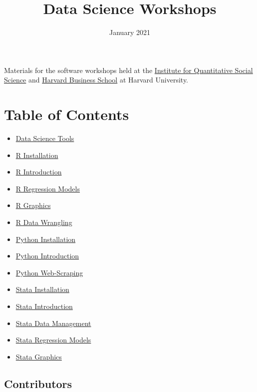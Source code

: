 \documentclass[
]{book}
\title{Data Science Workshops}
\author{}
\date{\vspace{-2.5em}January 2021}
\providecommand{\tightlist}{%
  \setlength{\itemsep}{0pt}\setlength{\parskip}{0pt}}
\begin{document}
\maketitle

{
\setcounter{tocdepth}{1}
\tableofcontents
}
Materials for the software workshops held at the \href{http://dss.iq.harvard.edu/}{Institute for Quantitative Social Science} and \href{https://training.rcs.hbs.org}{Harvard Business School} at Harvard University.

\hypertarget{table-of-contents}{%
\chapter*{Table of Contents}\label{table-of-contents}}

\begin{itemize}
\tightlist
\item
  \href{./DataScienceTools.html}{Data Science Tools}
\item
  \href{./Rinstall.html}{R Installation}
\item
  \href{./Rintro.html}{R Introduction}
\item
  \href{./Rmodels.html}{R Regression Models}
\item
  \href{./Rgraphics.html}{R Graphics}
\item
  \href{./RDataWrangling.html}{R Data Wrangling}
\item
  \href{./PythonInstall.html}{Python Installation}
\item
  \href{./PythonIntro.html}{Python Introduction}
\item
  \href{./PythonWebScrape.html}{Python Web-Scraping}
\item
  \href{./StataInstall.html}{Stata Installation}
\item
  \href{./StataIntro.html}{Stata Introduction}
\item
  \href{./StataDataManage.html}{Stata Data Management}
\item
  \href{./StataModels.html}{Stata Regression Models}
\item
  \href{./StataGraphics.html}{Stata Graphics}
\end{itemize}

\hypertarget{contributors}{%
\section*{Contributors}\label{contributors}}
\end{document}
